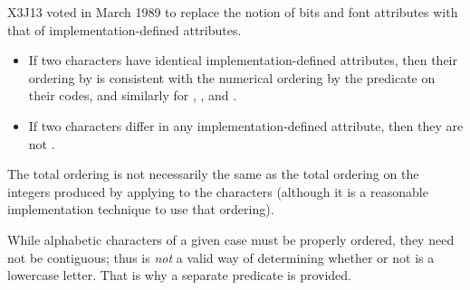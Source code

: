 \begin{defun}[Function]
\begin{newer}
X3J13 voted in March 1989 
to replace the notion of bits and font attributes with
that of implementation-defined attributes.

\begin{itemize}
\item
If two characters have identical implementation-defined attributes,
then their ordering by  is consistent with the numerical
ordering by the predicate \cdf{<} on their codes, and similarly
for , , and .

\item
If two characters differ in any implementation-defined
attribute, then they are not .
\end{itemize}
\end{newer}

The total ordering is not necessarily the same as the total
ordering on the integers produced by applying  to the
characters (although it is a reasonable implementation technique to
use that ordering).

While alphabetic characters of a given case must be
properly ordered, they need not be contiguous; thus  is {\it not} a valid way of determining whether or not  is a
lowercase letter.  That is why a separate
 predicate is provided.


\end{defun}
